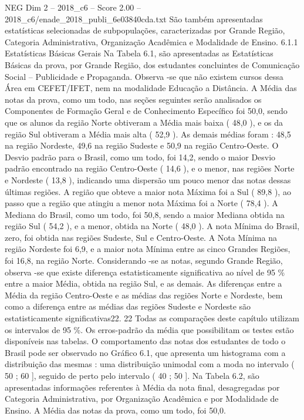 \begin{textsample}{NEG Dim 2 – 2018\_c6 – Score 2.00 – 2018\_c6/enade\_2018\_publi\_6e03840cda.txt}
São também apresentadas estatísticas selecionadas de subpopulações, caracterizadas por Grande Região, Categoria Administrativa, Organização Acadêmica e Modalidade de Ensino. 6.1.1 Estatísticas Básicas Gerais Na Tabela 6.1, são apresentadas as Estatísticas Básicas da prova, por Grande Região, dos estudantes concluintes de Comunicação Social – Publicidade e Propaganda.
Observa -se que não existem cursos dessa Área em CEFET/IFET, nem na modalidade Educação a Distância.
A Média das notas da prova, como um todo, nas seções seguintes serão analisados os Componentes de Formação Geral e de Conhecimento Específico foi 50,0, sendo que os alunos da região Norte obtiveram a Média mais baixa ( 48,0 ), e os da região Sul obtiveram a Média mais alta ( 52,9 ).
As demais médias foram : 48,5 na região Nordeste, 49,6 na região Sudeste e 50,9 na região Centro-Oeste.
O Desvio padrão para o Brasil, como um todo, foi 14,2, sendo o maior Desvio padrão encontrado na região Centro-Oeste ( 14,6 ), e o menor, nas regiões Norte e Nordeste ( 13,8 ), indicando uma dispersão um pouco menor das notas dessas últimas regiões.
A região que obteve a maior nota Máxima foi a Sul ( 89,8 ), ao passo que a região que atingiu a menor nota Máxima foi a Norte ( 78,4 ).
A Mediana do Brasil, como um todo, foi 50,8, sendo a maior Mediana obtida na região Sul ( 54,2 ), e a menor, obtida na Norte ( 48,0 ).
A nota Mínima do Brasil, zero, foi obtida nas regiões Sudeste, Sul e Centro-Oeste.
A Nota Mínima na região Nordeste foi 6,9, e a maior nota Mínima entre as cinco Grandes Regiões, foi 16,8, na região Norte.
Considerando -se as notas, segundo Grande Região, observa -se que existe diferença estatisticamente significativa ao nível de 95 \% entre a maior Média, obtida na região Sul, e as demais.
As diferenças entre a Média da região Centro-Oeste e as médias das regiões Norte e Nordeste, bem como a diferença entre as médias das regiões Sudeste e Nordeste são estatisticamente significativas22. 22 Todas as comparações deste capítulo utilizam os intervalos de 95 \%.
Os erros-padrão da média que possibilitam os testes estão disponíveis nas tabelas.
O comportamento das notas dos estudantes de todo o Brasil pode ser observado no Gráfico 6.1, que apresenta um histograma com a distribuição das mesmas : uma distribuição unimodal com a moda no intervalo ( 50 ; 60 ], seguido de perto pelo intervalo ( 40 ; 50 ].
Na Tabela 6.2, são apresentadas informações referentes à Média da nota final, desagregadas por Categoria Administrativa, por Organização Acadêmica e por Modalidade de Ensino.
A Média das notas da prova, como um todo, foi 50,0.

\end{textsample}
